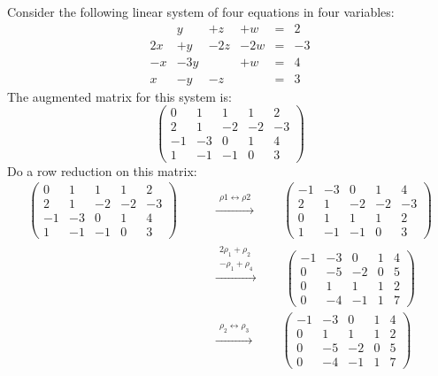 \documentclass[11pt]{article}
\theoremstyle{definition}
\def\rowop#1{\qquad\xrightarrow{\begin{matrix}#1\end{matrix}}\qquad}
\begin{document}
\noindent Consider the following linear system of four equations in four variables:
$$\begin{matrix}
    &   y &  +z &  +w & = & 2\\
 2x &  +y & -2z & -2w & = & -3\\
 -x & -3y &     &  +w & = & 4\\
  x &  -y &  -z &     & = & 3
\end{matrix}$$
The augmented matrix for this system is:
$$\left(\begin{array}{cccc|c}
   0 & 1 & 1 & 1 & 2 \\
   2 & 1 &-2 &-2 &-3 \\
  -1 &-3 & 0 & 1 & 4 \\
   1 &-1 &-1 & 0 & 3
\end{array}\right)$$
Do a row reduction on this matrix:
\begin{align*}
    \left(\begin{array}{cccc|c}
       0 & 1 & 1 & 1 & 2 \\
       2 & 1 &-2 &-2 &-3 \\
      -1 &-3 & 0 & 1 & 4 \\
       1 &-1 &-1 & 0 & 3
    \end{array}\right)
 &\rowop{\rho1\leftrightarrow\rho2}
    \left(\begin{array}{cccc|c}
      -1 &-3 & 0 & 1 & 4 \\
       2 & 1 &-2 &-2 &-3 \\
       0 & 1 & 1 & 1 & 2 \\
       1 &-1 &-1 & 0 & 3
    \end{array}\right) \\[15pt]
  &\rowop{2\rho_1+\rho_2\\ -\rho_1+\rho_4} 
    \left(\begin{array}{cccc|c}
      -1 &-3 & 0 & 1 & 4 \\
       0 &-5 &-2 & 0 & 5 \\
       0 & 1 & 1 & 1 & 2 \\
       0 &-4 &-1 & 1 & 7
    \end{array}\right) \\[15pt]
  &\rowop{\rho_2\leftrightarrow\rho_3} 
    \left(\begin{array}{cccc|c}
      -1 &-3 & 0 & 1 & 4 \\
       0 & 1 & 1 & 1 & 2 \\
       0 &-5 &-2 & 0 & 5 \\
       0 &-4 &-1 & 1 & 7
    \end{array}\right) \\[15pt]

\end{align*}
\end{document}
